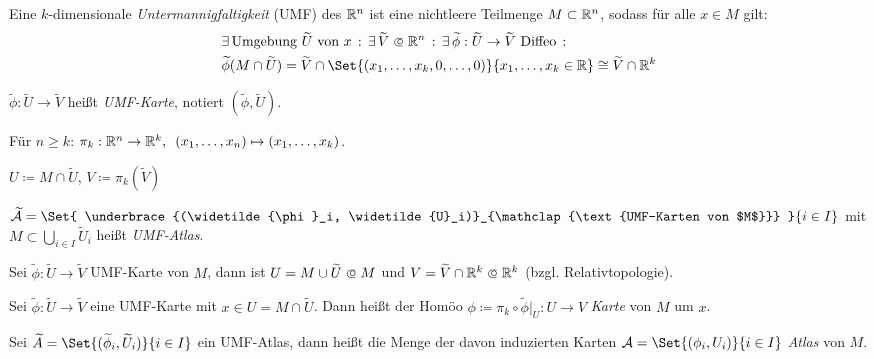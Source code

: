 \documentclass{cheat-sheet}
\newcommand{\Atlas}{\mathcal{A}} %
\theoremstyle{definition}
\begin{document}
\begin{defn}
  Eine $k$-dimensionale \emph{Untermannigfaltigkeit} (UMF) des $\mathbb{R}^n$ ist eine nichtleere Teilmenge $M \subset \mathbb{R}^n$, sodass für alle $x \in M$ gilt:
  \begin{align*}
    & \ex{\text{Umgebung $\widetilde{U}$ von $x$}} \ex{\widetilde{V} \opn \R^n} \ex{\widetilde{\phi} : \widetilde{U} \to \widetilde{V} \text{ Diffeo}} \\
    & \widetilde{\phi}(M \cap \widetilde{U}) = \widetilde{V} \cap \Set{ (x_1, \ldots, x_k, 0, \ldots, 0) }{ x_1, \ldots, x_k \in \R } \cong \widetilde{V} \cap \R^k
  \end{align*}
\end{defn}

\begin{nomenklatur}
  $\widetilde{\phi} : \widetilde{U} \to \widetilde{V}$ heißt \emph{UMF-Karte}, notiert $(\widetilde{\phi}, \widetilde{U})$.
\end{nomenklatur}

\begin{nota}
  Für $n \geq k$: $\pi_k : \mathbb{R}^n \to \mathbb{R}^k, \enspace (x_1, \ldots, x_n) \mapsto (x_1, \ldots, x_k)$.
\end{nota}

\begin{nota}
  $U \coloneqq M \cap \widetilde{U}$, \enspace $V \coloneqq \pi_k(\widetilde{V})$
\end{nota}

\begin{defn}
  $\widetilde{\Atlas} = \Set{ \underbrace{(\widetilde{\phi}_i, \widetilde{U}_i)}_{\mathclap{\text{UMF-Karten von $M$}}} }{ i \in I }$ mit $M \subset \bigcup_{i \in I} \widetilde{U}_i$ heißt \emph{UMF-Atlas}. %
\end{defn}

\begin{beob}
  Sei $\widetilde{\phi} : \widetilde{U} \to \widetilde{V}$ UMF-Karte von $M$, dann ist $U = M \cup \widetilde{U} \opn M$ und $V = \widetilde{V} \cap \R^k \opn \R^k$ (bzgl. Relativtopologie).
\end{beob}

\begin{defn}
  Sei $\widetilde{\phi} : \widetilde{U} \to \widetilde{V}$ eine UMF-Karte mit $x \in U = M \cap \widetilde{U}$. Dann heißt der Homöo $\phi \coloneqq \pi_k \circ \widetilde{\phi}|_{U} : U \to V$ \emph{Karte} von $M$ um $x$.
\end{defn}

\begin{defn}
  Sei $\widetilde{A} = \Set{ (\widetilde{\phi}_i, \widetilde{U}_i) }{ i \in I }$ ein UMF-Atlas, dann heißt die Menge der davon induzierten Karten $\Atlas = \Set{ (\phi_i, U_i) }{ i \in I }$ \emph{Atlas} von $M$.
\end{defn}
\end{document}
